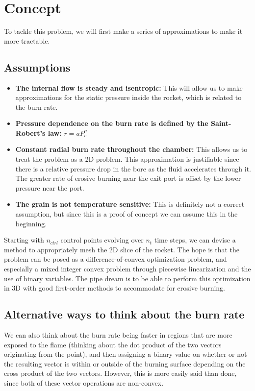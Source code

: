 \documentclass[12pt]{article}
\begin{document}
	\section{Concept}
	
	To tackle this problem, we will first make a series of approximations to make it more tractable. 
	
	\subsection{Assumptions}
	\begin{itemize}
		\item \textbf{The internal flow is steady and isentropic:} This will allow us to make approximations for the static pressure inside the rocket, which is related to the burn rate.
		\item \textbf{Pressure dependence on the burn rate is defined by the Saint-Robert's law:} $r = a P_c^n$
		\item \textbf{Constant radial burn rate throughout the chamber:} This allows us to treat the problem as a 2D problem. This approximation is justifiable since there is a relative pressure drop in the bore as the fluid accelerates through it. The greater rate of erosive burning near the exit port is offset by the lower pressure near the port. 
		\item \textbf{The grain is not temperature sensitive:} This is definitely not a correct assumption, but since this is a proof of concept we can assume this in the beginning. 
	\end{itemize}
	
	
	Starting with $n_{ctrl}$ control points evolving over $n_t$ time steps, we can devise a method to appropriately mesh the 2D slice of the rocket. 
	The hope is that the problem can be posed as a difference-of-convex optimization problem, and especially a mixed integer convex problem through piecewise linearization and the use of binary variables. 
	The pipe dream is to be able to perform this optimization in 3D with good first-order methods to accommodate for erosive burning. 
	
	\subsection{Alternative ways to think about the burn rate}
	We can also think about the burn rate being faster in regions that are more exposed to the flame (thinking about the dot product of the two vectors originating from the point), and then assigning a binary value on whether or not the resulting vector is within or outside of the burning surface depending on the cross product of the two vectors. However, this is more easily said than done, since both of these vector operations are non-convex. 
		
\end{document}
